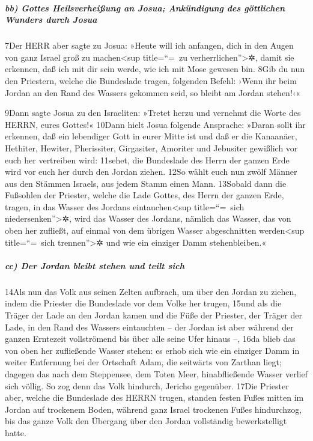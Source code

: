 \hypertarget{bb-gottes-heilsverheiuxdfung-an-josua-ankuxfcndigung-des-guxf6ttlichen-wunders-durch-josua}{%
\subparagraph{bb) Gottes Heilsverheißung an Josua; Ankündigung des
göttlichen Wunders durch
Josua}\label{bb-gottes-heilsverheiuxdfung-an-josua-ankuxfcndigung-des-guxf6ttlichen-wunders-durch-josua}}

7Der HERR aber sagte zu Josua: »Heute will ich anfangen, dich in den
Augen von ganz Israel groß zu machen\textless sup title=``=~zu
verherrlichen''\textgreater✲, damit sie erkennen, daß ich mit dir sein
werde, wie ich mit Mose gewesen bin. 8Gib du nun den Priestern, welche
die Bundeslade tragen, folgenden Befehl: ›Wenn ihr beim Jordan an den
Rand des Wassers gekommen seid, so bleibt am Jordan stehen!‹«

9Dann sagte Josua zu den Israeliten: »Tretet herzu und vernehmt die
Worte des HERRN, eures Gottes!« 10Dann hielt Josua folgende Ansprache:
»Daran sollt ihr erkennen, daß ein lebendiger Gott in eurer Mitte ist
und daß er die Kanaanäer, Hethiter, Hewiter, Pherissiter, Girgasiter,
Amoriter und Jebusiter gewißlich vor euch her vertreiben wird: 11sehet,
die Bundeslade des Herrn der ganzen Erde wird vor euch her durch den
Jordan ziehen. 12So wählt euch nun zwölf Männer aus den Stämmen Israels,
aus jedem Stamm einen Mann. 13Sobald dann die Fußsohlen der Priester,
welche die Lade Gottes, des Herrn der ganzen Erde, tragen, in das Wasser
des Jordans eintauchen\textless sup title=``=~sich
niedersenken''\textgreater✲, wird das Wasser des Jordans, nämlich das
Wasser, das von oben her zufließt, auf einmal von dem übrigen Wasser
abgeschnitten werden\textless sup title=``=~sich trennen''\textgreater✲
und wie ein einziger Damm stehenbleiben.«

\hypertarget{cc-der-jordan-bleibt-stehen-und-teilt-sich}{%
\subparagraph{cc) Der Jordan bleibt stehen und teilt
sich}\label{cc-der-jordan-bleibt-stehen-und-teilt-sich}}

14Als nun das Volk aus seinen Zelten aufbrach, um über den Jordan zu
ziehen, indem die Priester die Bundeslade vor dem Volke her trugen,
15und als die Träger der Lade an den Jordan kamen und die Füße der
Priester, der Träger der Lade, in den Rand des Wassers eintauchten --
der Jordan ist aber während der ganzen Erntezeit vollströmend bis über
alle seine Ufer hinaus --, 16da blieb das von oben her zufließende
Wasser stehen: es erhob sich wie ein einziger Damm in weiter Entfernung
bei der Ortschaft Adam, die seitwärts von Zarthan liegt; dagegen das
nach dem Steppensee, dem Toten Meer, hinabfließende Wasser verlief sich
völlig. So zog denn das Volk hindurch, Jericho gegenüber. 17Die Priester
aber, welche die Bundeslade des HERRN trugen, standen festen Fußes
mitten im Jordan auf trockenem Boden, während ganz Israel trockenen
Fußes hindurchzog, bis das ganze Volk den Übergang über den Jordan
vollständig bewerkstelligt hatte.

